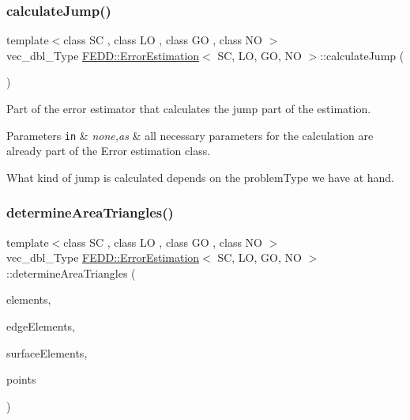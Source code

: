 \subsubsection{\texorpdfstring{calculate\+Jump()}{calculateJump()}}
{\footnotesize\ttfamily template$<$class SC , class LO , class GO , class NO $>$ \\
vec\+\_\+dbl\+\_\+\+Type \hyperlink{classFEDD_1_1ErrorEstimation}{F\+E\+D\+D\+::\+Error\+Estimation}$<$ SC, LO, GO, NO $>$\+::calculate\+Jump (\begin{DoxyParamCaption}{ }\end{DoxyParamCaption})}



Part of the error estimator that calculates the jump part of the estimation. 


\begin{DoxyParams}[1]{Parameters}
\mbox{\tt in}  & {\em none,as} & all necessary parameters for the calculation are already part of the Error estimation class.\\
\hline
\end{DoxyParams}
What kind of jump is calculated depends on the problem\+Type we have at hand. \mbox{\label{classFEDD_1_1ErrorEstimation_a1623aca9e03e8e2dba9ea82ce60152cf}} 
\subsubsection{\texorpdfstring{determine\+Area\+Triangles()}{determineAreaTriangles()}}
{\footnotesize\ttfamily template$<$class SC , class LO , class GO , class NO $>$ \\
vec\+\_\+dbl\+\_\+\+Type \hyperlink{classFEDD_1_1ErrorEstimation}{F\+E\+D\+D\+::\+Error\+Estimation}$<$ SC, LO, GO, NO $>$\+::determine\+Area\+Triangles (\begin{DoxyParamCaption}\item[{\hyperlink{classFEDD_1_1ErrorEstimation_ae8e03ce6215a8a139c1c8e9d662030ce}{Elements\+Ptr\+\_\+\+Type}}]{elements,  }\item[{\hyperlink{classFEDD_1_1ErrorEstimation_ac7ab89f64446e4c6e739058240497f04}{Edge\+Elements\+Ptr\+\_\+\+Type}}]{edge\+Elements,  }\item[{\hyperlink{classFEDD_1_1ErrorEstimation_a391a95553efe67657e031e1af4ec02cc}{Surface\+Elements\+Ptr\+\_\+\+Type}}]{surface\+Elements,  }\item[{vec2\+D\+\_\+dbl\+\_\+ptr\+\_\+\+Type}]{points }\end{DoxyParamCaption})}



